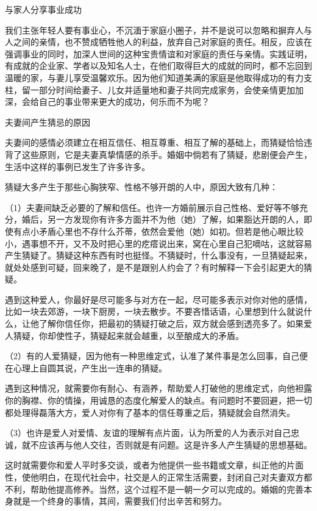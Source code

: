 \documentclass[12pt,UTF8,openany]{ctexbook}
\begin{document}
与家人分享事业成功


我们主张年轻人要有事业心，不沉湎于家庭小圈子，并不是说可以忽略和摒弃人与人之间的亲情，也不赞成牺牲他人的利益，放弃自己对家庭的责任。相反，应该在强调事业的同时，加深人世间的这种宝贵情谊和对家庭的责任与亲情。实践证明，有成就的企业家、学者以及知名人士，在他们取得巨大的成就的同时，都不忘回到温暖的家，与妻儿享受温馨欢乐。因为他们知道美满的家庭是他取得成功的有力支柱，留一部分时间给妻子、儿女并适量地和妻子共同完成家务，会使亲情更加加深，会给自己的事业带来更大的成功，何乐而不为呢？





夫妻间产生猜忌的原因


夫妻间的感情必须建立在相互信任、相互尊重、相互了解的基础上，而猜疑恰恰违背了这些原则，它是夫妻真挚情感的杀手。婚姻中倘若有了猜疑，悲剧便会产生，生活中这样的事例已发生了许多许多。

猜疑大多产生于那些心胸狭窄、性格不够开朗的人中，原因大致有几种：

（1）夫妻间缺乏必要的了解和信任。也许一方婚前展示自己性格、爱好等不够充分，婚后，另一方发现你有许多方面并不为他（她）了解，如果豁达开朗的人，即使有点小矛盾心里也不存什么芥蒂，依然会爱他（她）如初。但若是他心眼比较小，遇事想不开，又不及时把心里的疙瘩说出来，窝在心里自己犯嘀咕，这就容易产生猜疑了。猜疑这种东西有时也挺怪。不猜疑时，什么事没有，一旦猜疑起来，就处处感到可疑，回来晚了，是不是跟别人约会了？有时解释一下会引起更大的猜疑。

遇到这种爱人，你最好是尽可能多与对方在一起，尽可能多表示对你对他的感情，比如一块去郊游，一块下厨房，一块去散步。不要吝惜话语，心里想到什么就说什么，让他了解你信任你，把最初的猜疑打破之后，双方就会感到透亮多了。如果爱人猜疑，你却使性子，猜疑起来就会越重，以至酿成大的矛盾。

（2）有的人爱猜疑，因为他有一种思维定式，认准了某件事是怎么回事，自己便在心理上自圆其说，产生出一连串的猜疑。

遇到这种情况，就需要你有耐心、有涵养，帮助爱人打破他的思维定式，向他袒露你的胸襟、你的情操，用诚恳的态度化解爱人的缺点。有问题时不要回避，把一切都处理得磊落大方，爱人对你有了基本的信任尊重之后，猜疑就会自然消失。

（3）也许是爱人对爱情、友谊的理解有点片面，认为所爱的人为表示对自己忠诚，就不应该再与他人交往，否则就是有问题。这是许多人产生猜疑的思想基础。

这时就需要你和爱人平时多交谈，或者为他提供一些书籍或文章，纠正他的片面性，使他明白，在现代社会中，社交是人的正常生活需要，封闭自己对夫妻双方都不利，帮助他提高修养。当然，这个过程不是一朝一夕可以完成的。婚姻的完善本身就是一个终身的事情，其间，需要我们付出辛苦和努力。
\end{document}

